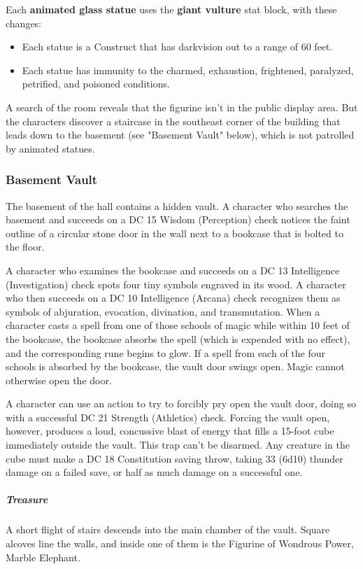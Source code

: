 \documentclass[10pt,a4paper,twoside,bg=print,twocolumn,openany,nodeprecatedcode]{dndbook}
\begin{document}
Each \textbf{animated glass statue} uses the \textbf{giant vulture} stat block, with these changes:


\begin{itemize}
\item Each statue is a Construct that has darkvision out to a range of 60 feet.
\item Each statue has immunity to the charmed, exhaustion, frightened, paralyzed, petrified, and poisoned conditions.
\end{itemize}

A search of the room reveals that the figurine isn't in the public display area. But the characters discover a staircase in the southeast corner of the building that leads down to the basement (see "Basement Vault" below), which is not patrolled by animated statues.

\subsubsection{Basement Vault}
The basement of the hall contains a hidden vault. A character who searches the basement and succeeds on a DC 15 Wisdom (Perception) check notices the faint outline of a circular stone door in the wall next to a bookcase that is bolted to the floor.

A character who examines the bookcase and succeeds on a DC 13 Intelligence (Investigation) check spots four tiny symbols engraved in its wood. A character who then succeeds on a DC 10 Intelligence (Arcana) check recognizes them as symbols of abjuration, evocation, divination, and transmutation. When a character casts a spell from one of those schools of magic while within 10 feet of the bookcase, the bookcase absorbs the spell (which is expended with no effect), and the corresponding rune begins to glow. If a spell from each of the four schools is absorbed by the bookcase, the vault door swings open. Magic cannot otherwise open the door.

A character can use an action to try to forcibly pry open the vault door, doing so with a successful DC 21 Strength (Athletics) check. Forcing the vault open, however, produces a loud, concussive blast of energy that fills a 15-foot cube immediately outside the vault. This trap can't be disarmed. Any creature in the cube must make a DC 18 Constitution saving throw, taking 33 (6d10) thunder damage on a failed save, or half as much damage on a successful one.

\subparagraph{Treasure}
A short flight of stairs descends into the main chamber of the vault. Square alcoves line the walls, and inside one of them is the Figurine of Wondrous Power, Marble Elephant.
\end{document}
